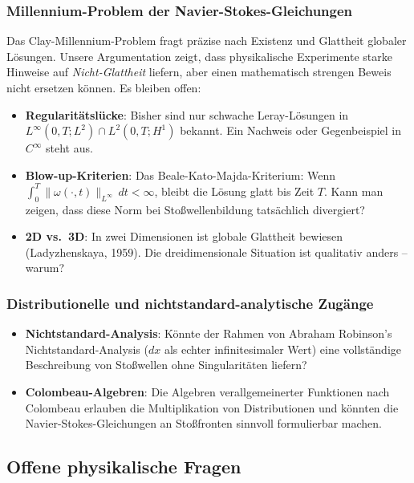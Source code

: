 ﻿\documentclass[12pt,a4paper]{article}
\theoremstyle{definition}
\theoremstyle{remark}
\begin{document}
\subsubsection{Millennium-Problem der Navier-Stokes-Gleichungen}

Das Clay-Millennium-Problem fragt präzise nach Existenz und Glattheit globaler Lösungen. Unsere Argumentation zeigt, dass physikalische Experimente starke Hinweise auf \emph{Nicht-Glattheit} liefern, aber einen mathematisch strengen Beweis nicht ersetzen können. Es bleiben offen:

\begin{itemize}
\item \textbf{Regularitätslücke}: Bisher sind nur schwache Leray-Lösungen in $L^\infty(0,T; L^2) \cap L^2(0,T; H^1)$ bekannt. Ein Nachweis oder Gegenbeispiel in $C^\infty$ steht aus.
\item \textbf{Blow-up-Kriterien}: Das Beale-Kato-Majda-Kriterium: Wenn $\int_0^T \|\omega(\cdot,t)\|_{L^\infty}\,dt < \infty$, bleibt die Lösung glatt bis Zeit $T$. Kann man zeigen, dass diese Norm bei Stoßwellenbildung tatsächlich divergiert?
\item \textbf{2D vs.\ 3D}: In zwei Dimensionen ist globale Glattheit bewiesen (Ladyzhenskaya, 1959). Die dreidimensionale Situation ist qualitativ anders -- warum?
\end{itemize}

\subsubsection{Distributionelle und nichtstandard-analytische Zugänge}

\begin{itemize}
\item \textbf{Nichtstandard-Analysis}: Könnte der Rahmen von Abraham Robinson's Nicht\-standard-Analysis ($dx$ als echter infinitesimaler Wert) eine vollständige Beschreibung von Stoßwellen ohne Singularitäten liefern?
\item \textbf{Colombeau-Algebren}: Die Algebren verallgemeinerter Funktionen nach Colombeau erlauben die Multiplikation von Distributionen und könnten die Navier-Stokes-Gleichungen an Stoßfronten sinnvoll formulierbar machen.
\end{itemize}

\subsection{Offene physikalische Fragen}
\end{document}
